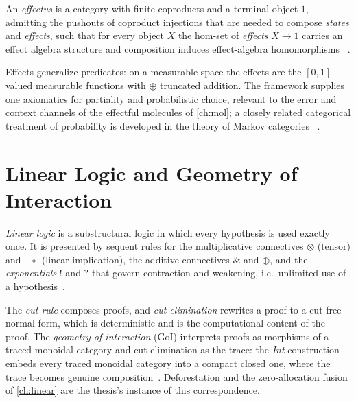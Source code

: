 \begin{definition}[Effectus]
An \emph{effectus} is a category with finite coproducts and a terminal object
$1$, admitting the pushouts of coproduct injections that are needed to
compose \emph{states} and \emph{effects}, such that for every object $X$ the
hom-set of \emph{effects} $X \to 1$ carries an effect algebra structure and
composition induces effect-algebra homomorphisms
~\cite{arxiv-effectus}.
\end{definition}

\begin{remark}
Effects generalize predicates: on a measurable space the effects are the
$[0,1]$-valued measurable functions with $\oplus$ truncated addition. The
framework supplies one axiomatics for partiality and probabilistic choice,
relevant to the error and context channels of the effectful molecules of
\autoref{ch:mol}; a closely related categorical treatment of probability is
developed in the theory of Markov categories
~\cite{arxiv-effectus, arxiv-markov-categories}.
\end{remark}

\section{Linear Logic and Geometry of Interaction}\label{sec:prelim-linear}

\begin{definition}
\emph{Linear logic} is a substructural logic in which every hypothesis is
used exactly once. It is presented by sequent rules for the multiplicative
connectives $\otimes$ (tensor) and $\multimap$ (linear implication), the
additive connectives $\&$ and $\oplus$, and the \emph{exponentials} $!$ and
$?$ that govern contraction and weakening, i.e.\ unlimited use of a
hypothesis~\cite{girard}.
\end{definition}

\begin{remark}
The \emph{cut rule} composes proofs, and \emph{cut elimination} rewrites a
proof to a cut-free normal form, which is deterministic and is the
computational content of the proof. The \emph{geometry of interaction} (GoI)
interprets proofs as morphisms of a traced monoidal category and cut
elimination as the trace: the \emph{Int} construction embeds every traced
monoidal category into a compact closed one, where the trace becomes genuine
composition~\cite{girard, joyalsv, arxiv-linear-logic-goi}. Deforestation
and the zero-allocation fusion of \autoref{ch:linear} are the thesis's
instance of this correspondence.
\end{remark}

